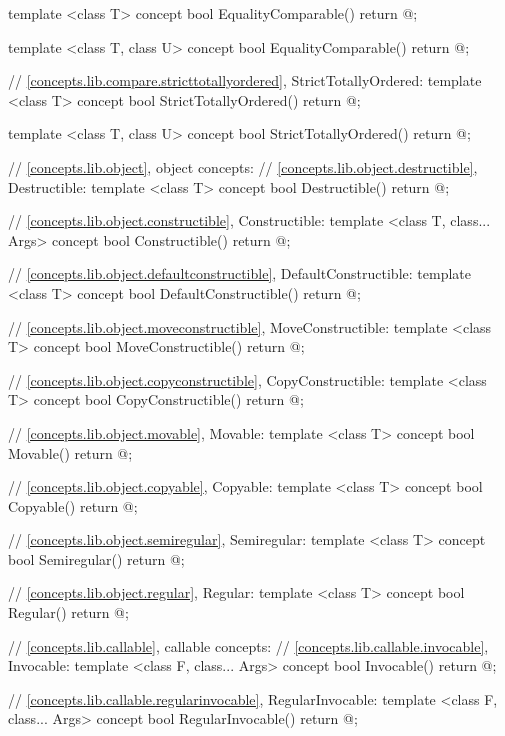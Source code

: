 \begin{codeblock}
{{{{  template <class T>
  concept bool EqualityComparable() {
    return @\seebelow@;
  }

  template <class T, class U>
  concept bool EqualityComparable() {
    return @\seebelow@;
  }

  // \ref{concepts.lib.compare.stricttotallyordered}, StrictTotallyOrdered:
  template <class T>
  concept bool StrictTotallyOrdered() {
    return @\seebelow@;
  }

  template <class T, class U>
  concept bool StrictTotallyOrdered() {
    return @\seebelow@;
  }

  // \ref{concepts.lib.object}, object concepts:
  // \ref{concepts.lib.object.destructible}, Destructible:
  template <class T>
  concept bool Destructible() {
    return @\seebelow@;
  }

  // \ref{concepts.lib.object.constructible}, Constructible:
  template <class T, class... Args>
  concept bool Constructible() {
    return @\seebelow@;
  }

  // \ref{concepts.lib.object.defaultconstructible}, DefaultConstructible:
  template <class T>
  concept bool DefaultConstructible() {
    return @\seebelow@;
  }

  // \ref{concepts.lib.object.moveconstructible}, MoveConstructible:
  template <class T>
  concept bool MoveConstructible() {
    return @\seebelow@;
  }

  // \ref{concepts.lib.object.copyconstructible}, CopyConstructible:
  template <class T>
  concept bool CopyConstructible() {
    return @\seebelow@;
  }

  // \ref{concepts.lib.object.movable}, Movable:
  template <class T>
  concept bool Movable() {
    return @\seebelow@;
  }

  // \ref{concepts.lib.object.copyable}, Copyable:
  template <class T>
  concept bool Copyable() {
    return @\seebelow@;
  }

  // \ref{concepts.lib.object.semiregular}, Semiregular:
  template <class T>
  concept bool Semiregular() {
    return @\seebelow@;
  }

  // \ref{concepts.lib.object.regular}, Regular:
  template <class T>
  concept bool Regular() {
    return @\seebelow@;
  }

  // \ref{concepts.lib.callable}, callable concepts:
  // \ref{concepts.lib.callable.invocable}, Invocable:
  template <class F, class... Args>
  concept bool Invocable() {
    return @\seebelow@;
  }

  // \ref{concepts.lib.callable.regularinvocable}, RegularInvocable:
  template <class F, class... Args>
  concept bool RegularInvocable() {
    return @\seebelow@;
  }

}}}}
\end{codeblock}
